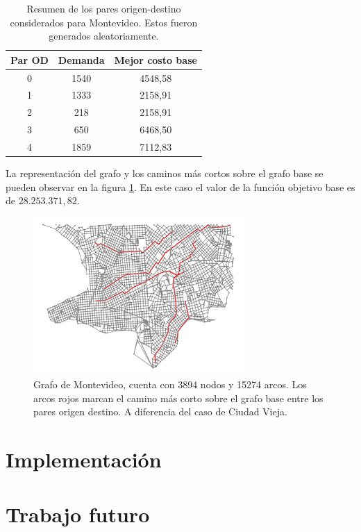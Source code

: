 \documentclass{article}
\begin{document}
  \begin{table}[h!]
    \centering
    \begin{tabular}{ccc}
      \toprule
      Par OD & Demanda & Mejor costo base \\
      \midrule
      0 & 1540 & 4548,58 \\
      1 & 1333 & 2158,91 \\
      2 & 218 & 2158,91 \\
      3 & 650 & 6468,50 \\
      4 & 1859 & 7112,83 \\
      \bottomrule
    \end{tabular}
    \caption{Resumen de los pares origen-destino considerados para Montevideo. Estos fueron generados aleatoriamente.}\label{table:odsmontevideo}
  \end{table}

  La representación del grafo y los caminos más cortos sobre el grafo base se pueden observar en la figura \ref{montevideo}. En este caso el valor de la función objetivo base es de $28.253.371,82$.

  \begin{figure}[h!]
    \centering
    \includegraphics[width=8cm]{imgs/mdeo_large_base.png}
    \caption{Grafo de Montevideo, cuenta con 3894 nodos y 15274 arcos. Los arcos rojos marcan el camino más corto sobre el grafo base entre los pares origen destino. A diferencia del caso de Ciudad Vieja.}
    \label{montevideo}
  \end{figure}

  \section*{Implementación}

  \section*{Trabajo futuro}
\end{document}
